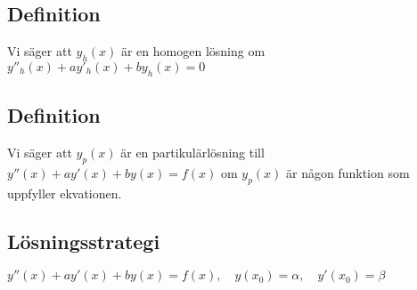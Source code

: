 \documentclass{article}
\begin{document}
\subsection{Definition}
Vi säger att $y_{h}(x)$ är en homogen lösning om $y''_{h}(x)+ay'_{h}(x)+by_{h}(x)=0$

\subsection{Definition}
Vi säger att $y_{p}(x)$ är en partikulärlösning till $y''(x)+ay'(x)+by(x)=f(x)$ om $y_{p}(x)$ är någon funktion som uppfyller ekvationen.

\subsection{Lösningsstrategi}
$y''(x)+ay'(x)+by(x)=f(x),\quad y(x_{0})=\alpha,\quad y'(x_{0})=\beta$
\end{document}
